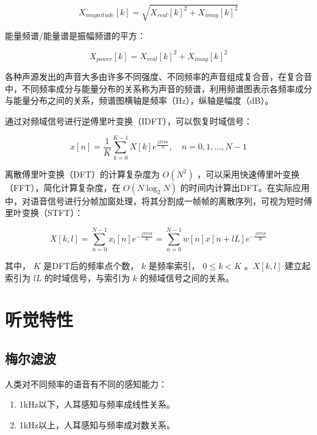 \documentclass[cn,10pt,math=newtx,citestyle=gb7714-2015,bibstyle=gb7714-2015]{elegantbook}
\begin{document}
\begin{equation}
  X_{magnitude}[k]=\sqrt{X_{real}[k]^2+X_{imag}[k]^2}
\end{equation}

能量频谱/能量谱是振幅频谱的平方：

\begin{equation}
  X_{power}[k]=X_{real}[k]^2+X_{imag}[k]^2
\end{equation}

各种声源发出的声音大多由许多不同强度、不同频率的声音组成复合音，在复合音中，不同频率成分与能量分布的关系称为声音的频谱，利用频谱图表示各频率成分与能量分布之间的关系，频谱图横轴是频率（Hz），纵轴是幅度（dB）。

通过对频域信号进行逆傅里叶变换（IDFT），可以恢复时域信号：

\begin{equation}
  x[n]=\frac{1}{K}\sum_{k=0}^{K-1}X[k]e^{\frac{j2\pi kn}{N}},\quad n=0,1,...,N-1
\end{equation}

离散傅里叶变换（DFT）的计算复杂度为 $O(N^2)$ ，可以采用快速傅里叶变换（FFT），简化计算复杂度，在 $O(N\mathop{log}_2 N)$ 的时间内计算出DFT。在实际应用中，对语音信号进行分帧加窗处理，将其分割成一帧帧的离散序列，可视为短时傅里叶变换（STFT）：

\begin{equation}
  X[k,l]=\sum_{n=0}^{N-1} x_l[n]e^{-\frac{j2\pi nk}{K}}=\sum_{n=0}^{N-1} w[n]x[n+lL]e^{-\frac{j2\pi nk}{K}}
\end{equation}

其中， $K$ 是DFT后的频率点个数， $k$ 是频率索引， $0\leq k< K$ 。$X[k,l]$ 建立起索引为 $lL$ 的时域信号，与索引为 $k$ 的频域信号之间的关系。

\section{听觉特性}

\subsection{梅尔滤波}

人类对不同频率的语音有不同的感知能力：

\begin{enumerate}
  \item 1kHz以下，人耳感知与频率成线性关系。
  \item 1kHz以上，人耳感知与频率成对数关系。
\end{enumerate}
\end{document}
